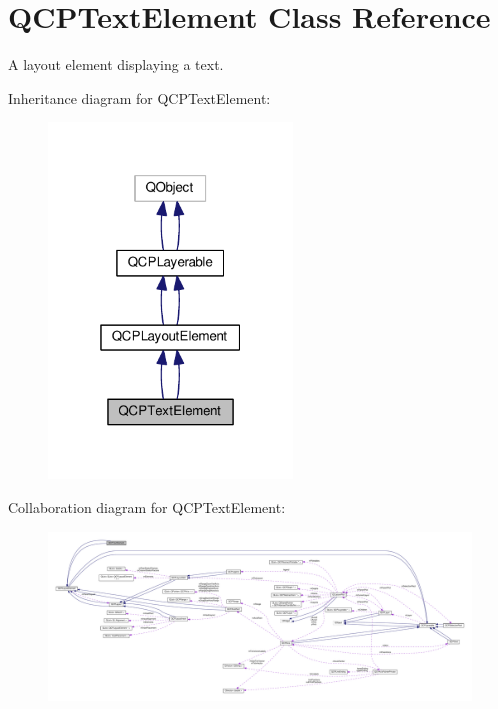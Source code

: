 \hypertarget{class_q_c_p_text_element}{}\section{Q\+C\+P\+Text\+Element Class Reference}
\label{class_q_c_p_text_element}


A layout element displaying a text.  




Inheritance diagram for Q\+C\+P\+Text\+Element\+:\nopagebreak
\begin{figure}[H]
\begin{center}
\leavevmode
\includegraphics[width=184pt]{class_q_c_p_text_element__inherit__graph}
\end{center}
\end{figure}


Collaboration diagram for Q\+C\+P\+Text\+Element\+:\nopagebreak
\begin{figure}[H]
\begin{center}
\leavevmode
\includegraphics[width=350pt]{class_q_c_p_text_element__coll__graph}
\end{center}
\end{figure}
